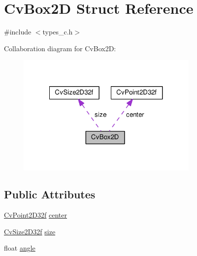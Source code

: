 \hypertarget{structCvBox2D}{\section{Cv\-Box2\-D Struct Reference}
\label{structCvBox2D}
}


{\ttfamily \#include $<$types\-\_\-c.\-h$>$}



Collaboration diagram for Cv\-Box2\-D\-:\nopagebreak
\begin{figure}[H]
\begin{center}
\leavevmode
\includegraphics[width=251pt]{structCvBox2D__coll__graph}
\end{center}
\end{figure}
\subsection*{Public Attributes}
\begin{DoxyCompactItemize}
\item 
\hyperlink{structCvPoint2D32f}{Cv\-Point2\-D32f} \hyperlink{structCvBox2D_aa643ec82a301850a958b77ff80951da2}{center}
\item 
\hyperlink{structCvSize2D32f}{Cv\-Size2\-D32f} \hyperlink{structCvBox2D_adf96a3b9aaede51ab36ea74eca252d51}{size}
\item 
float \hyperlink{structCvBox2D_a18fa38be22dc16224a21958caf99926a}{angle}
\end{DoxyCompactItemize}


